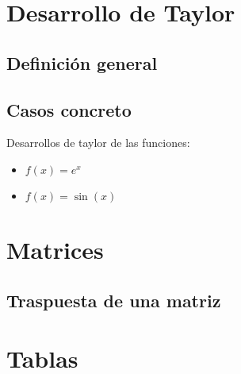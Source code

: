 \documentclass{article}
\begin{document}
\section{Desarrollo de Taylor}

\subsection{Definición general}


\subsection{Casos concreto}

Desarrollos de taylor de las funciones:

\begin{itemize}
\item $f(x)=e^x$


\item $f(x) = \sin (x)$


\end{itemize}

\section{Matrices}


\subsection{Traspuesta de una matriz}


\section{Tablas}

\end{document}
